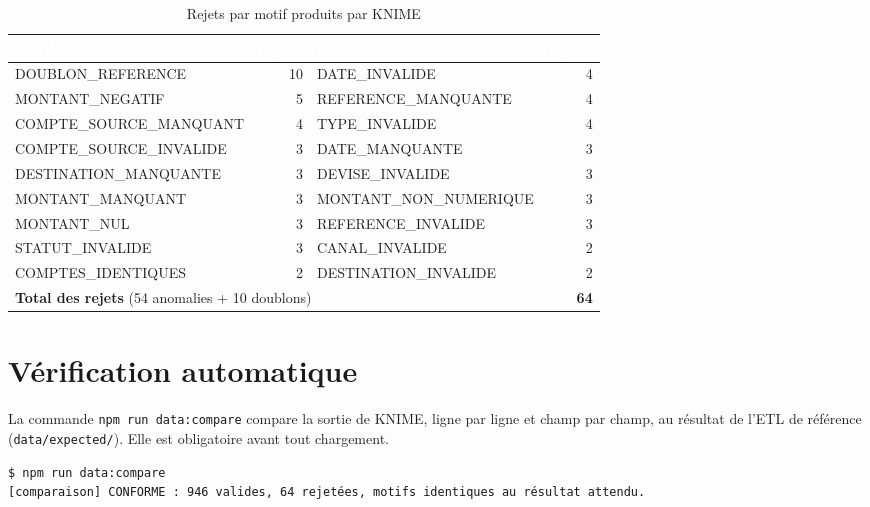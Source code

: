 \begin{table}[H]
\centering\small
\caption{Rejets par motif produits par KNIME}
\label{tab:knime-motifs}
\begin{tabular}{|l|r|l|r|}
\hline
\rowcolor{bluedark}\textcolor{white}{\textbf{Motif}} & \textcolor{white}{\textbf{Lignes}} & \textcolor{white}{\textbf{Motif}} & \textcolor{white}{\textbf{Lignes}} \\
\hline
DOUBLON\_REFERENCE & 10 & DATE\_INVALIDE & 4 \\
\hline
MONTANT\_NEGATIF & 5 & REFERENCE\_MANQUANTE & 4 \\
\hline
COMPTE\_SOURCE\_MANQUANT & 4 & TYPE\_INVALIDE & 4 \\
\hline
COMPTE\_SOURCE\_INVALIDE & 3 & DATE\_MANQUANTE & 3 \\
\hline
DESTINATION\_MANQUANTE & 3 & DEVISE\_INVALIDE & 3 \\
\hline
MONTANT\_MANQUANT & 3 & MONTANT\_NON\_NUMERIQUE & 3 \\
\hline
MONTANT\_NUL & 3 & REFERENCE\_INVALIDE & 3 \\
\hline
STATUT\_INVALIDE & 3 & CANAL\_INVALIDE & 2 \\
\hline
COMPTES\_IDENTIQUES & 2 & DESTINATION\_INVALIDE & 2 \\
\hline
\multicolumn{3}{|l|}{\textbf{Total des rejets} (54 anomalies + 10 doublons)} & \textbf{64} \\
\hline
\end{tabular}
\end{table}


\section{Vérification automatique}
La commande \texttt{npm run data:compare} compare la sortie de KNIME, ligne par ligne et champ par
champ, au résultat de l'ETL de référence (\texttt{data/expected/}). Elle est obligatoire avant tout
chargement.

\begin{lstlisting}[caption={Vérification de la sortie KNIME}]
$ npm run data:compare
[comparaison] CONFORME : 946 valides, 64 rejetées, motifs identiques au résultat attendu.
\end{lstlisting}



